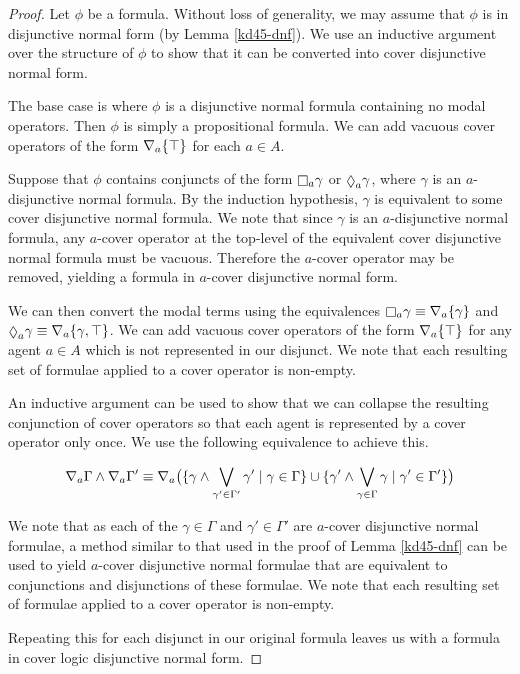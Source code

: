 \begin{proof}
Let $\phi$ be a \logicKD{} formula.  Without loss of generality, we may assume
that $\phi$ is in disjunctive normal form (by Lemma \ref{kd45-dnf}). We use an
inductive argument over the structure of $\phi$ to show that it can be converted
into cover disjunctive normal form.

The base case is where $\phi$ is a disjunctive normal formula containing no
modal operators. Then $\phi$ is simply a propositional formula. We can add
vacuous cover operators of the form $\nabla_a \{\top\}$ for each $a \in A$.

Suppose that $\phi$ contains conjuncts of the form $\knows_a \gamma$ or
$\suspects_a \gamma$, where $\gamma$ is an $a$-disjunctive normal formula. By
the induction hypothesis, $\gamma$ is equivalent to some cover disjunctive
normal formula. We note that since $\gamma$ is an $a$-disjunctive normal
formula, any $a$-cover operator at the top-level of the equivalent cover
disjunctive normal formula must be vacuous. Therefore the $a$-cover operator may
be removed, yielding a formula in $a$-cover disjunctive normal form.

We can then convert the modal terms using the equivalences $\knows_a \gamma
\equiv \covers_a \{\gamma\}$ and $\suspects_a \gamma \equiv \covers_a \{\gamma,
\top\}$. We can add vacuous cover operators of the form $\nabla_a \{\top\}$ for
any agent $a \in A$ which is not represented in our disjunct. We note that each
resulting set of formulae applied to a cover operator is non-empty.

An inductive argument can be used to show that we can collapse the resulting
conjunction of cover operators so that each agent is represented by a cover
operator only once. We use the following equivalence to achieve this.

$$
\nabla_a \Gamma \land \nabla_a \Gamma' \equiv 
\nabla_a \big( 
\{ \gamma \land \bigvee_{\gamma' \in \Gamma'} \gamma' \mid \gamma \in \Gamma \}
\cup
\{ \gamma' \land \bigvee_{\gamma \in \Gamma} \gamma \mid \gamma' \in \Gamma' \}
\big)
$$

We note that as each of the $\gamma \in \Gamma$ and $\gamma' \in \Gamma'$ are
$a$-cover disjunctive normal formulae, a method similar to that used in the
proof of Lemma \ref{kd45-dnf} can be used to yield $a$-cover disjunctive normal
formulae that are equivalent to conjunctions and disjunctions of these formulae.
We note that each resulting set of formulae applied to a cover operator is
non-empty.

Repeating this for each disjunct in our original formula leaves us with a
formula in cover logic disjunctive normal form.
\end{proof}

